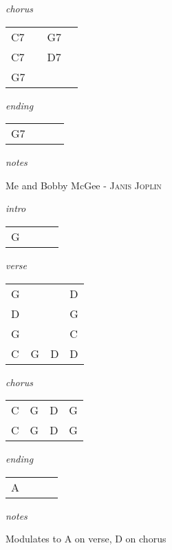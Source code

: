 \documentclass[12pt]{article}
\begin{document}
\textit{chorus}

\begin{tabular}{|P{1.25in}|P{1.25in}|P{1.25in}|P{1.25in}|}
  C7 &   &  G7 &   \\
  C7 &   &  D7 &   \\
  G7 &   &     &   \\
\end{tabular}

\textit{ending}

\begin{tabular}{|P{1.25in}|P{1.25in}|P{1.25in}|P{1.25in}|}
  G7 &   &   &   \\
\end{tabular}

\textit{notes}

\newpage

{\Huge Me and Bobby McGee} {\huge - \textsc{Janis Joplin}}

\huge
\textit{intro}

\begin{tabular}{|P{1.25in}|P{1.25in}|P{1.25in}|P{1.25in}|}
  G &   &   &   \\
\end{tabular}

\textit{verse}

\begin{tabular}{|P{1.25in}|P{1.25in}|P{1.25in}|P{1.25in}|}
  G &   &   &  D \\
  D &   &   &  G \\
  G &   &   &  C \\
  C & G & D &  D \\ 
\end{tabular}

\textit{chorus}

\begin{tabular}{|P{1.25in}|P{1.25in}|P{1.25in}|P{1.25in}|}
  C & G  & D  &  G \\
  C & G  & D  &  G
\end{tabular}

\textit{ending}

\begin{tabular}{|P{1.25in}|P{1.25in}|P{1.25in}|P{1.25in}|}
  A &   &   &   \\
\end{tabular}

\textit{notes}

Modulates to A on verse, D on chorus

\newpage
\end{document}
